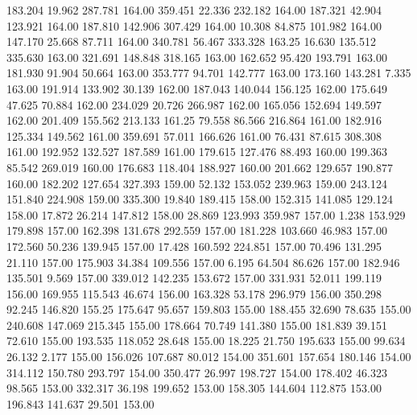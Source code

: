  183.204   19.962  287.781       164.00
 359.451   22.336  232.182       164.00
 187.321   42.904  123.921       164.00
 187.810  142.906  307.429       164.00
  10.308   84.875  101.982       164.00
 147.170   25.668   87.711       164.00
 340.781   56.467  333.328       163.25
  16.630  135.512  335.630       163.00
 321.691  148.848  318.165       163.00
 162.652   95.420  193.791       163.00
 181.930   91.904   50.664       163.00
 353.777   94.701  142.777       163.00
 173.160  143.281    7.335       163.00
 191.914  133.902   30.139       162.00
 187.043  140.044  156.125       162.00
 175.649   47.625   70.884       162.00
 234.029   20.726  266.987       162.00
 165.056  152.694  149.597       162.00
 201.409  155.562  213.133       161.25
  79.558   86.566  216.864       161.00
 182.916  125.334  149.562       161.00
 359.691   57.011  166.626       161.00
  76.431   87.615  308.308       161.00
 192.952  132.527  187.589       161.00
 179.615  127.476   88.493       160.00
 199.363   85.542  269.019       160.00
 176.683  118.404  188.927       160.00
 201.662  129.657  190.877       160.00
 182.202  127.654  327.393       159.00
  52.132  153.052  239.963       159.00
 243.124  151.840  224.908       159.00
 335.300   19.840  189.415       158.00
 152.315  141.085  129.124       158.00
  17.872   26.214  147.812       158.00
  28.869  123.993  359.987       157.00
   1.238  153.929  179.898       157.00
 162.398  131.678  292.559       157.00
 181.228  103.660   46.983       157.00
 172.560   50.236  139.945       157.00
  17.428  160.592  224.851       157.00
  70.496  131.295   21.110       157.00
 175.903   34.384  109.556       157.00
   6.195   64.504   86.626       157.00
 182.946  135.501    9.569       157.00
 339.012  142.235  153.672       157.00
 331.931   52.011  199.119       156.00
 169.955  115.543   46.674       156.00
 163.328   53.178  296.979       156.00
 350.298   92.245  146.820       155.25
 175.647   95.657  159.803       155.00
 188.455   32.690   78.635       155.00
 240.608  147.069  215.345       155.00
 178.664   70.749  141.380       155.00
 181.839   39.151   72.610       155.00
 193.535  118.052   28.648       155.00
  18.225   21.750  195.633       155.00
  99.634   26.132    2.177       155.00
 156.026  107.687   80.012       154.00
 351.601  157.654  180.146       154.00
 314.112  150.780  293.797       154.00
 350.477   26.997  198.727       154.00
 178.402   46.323   98.565       153.00
 332.317   36.198  199.652       153.00
 158.305  144.604  112.875       153.00
 196.843  141.637   29.501       153.00
